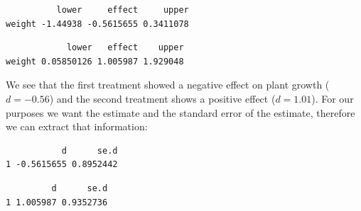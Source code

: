 \documentclass[
  letterpaper,
  DIV=11,
  numbers=noendperiod]{scrreprt}
\newenvironment{Shaded}{}{}
\newcommand{\AttributeTok}[1]{\textcolor[rgb]{0.00,0.34,0.68}{#1}}
\newcommand{\CommentTok}[1]{\textcolor[rgb]{0.54,0.53,0.53}{#1}}
\newcommand{\FunctionTok}[1]{\textcolor[rgb]{0.39,0.29,0.61}{#1}}
\newcommand{\NormalTok}[1]{\textcolor[rgb]{0.12,0.11,0.11}{#1}}
\newcommand{\OtherTok}[1]{\textcolor[rgb]{0.00,0.43,0.16}{#1}}
\newcommand{\SpecialCharTok}[1]{\textcolor[rgb]{0.24,0.68,0.91}{#1}}
\newcommand{\StringTok}[1]{\textcolor[rgb]{0.75,0.01,0.01}{#1}}
\begin{document}
\begin{tcolorbox}
\begin{verbatim}
          lower     effect     upper
weight -1.44938 -0.5615655 0.3411078
\end{verbatim}

\begin{Shaded}
\end{Shaded}

\begin{verbatim}
            lower   effect    upper
weight 0.05850126 1.005987 1.929048
\end{verbatim}

We see that the first treatment showed a negative effect on plant growth
(\(d=-0.56\)) and the second treatment shows a positive effect
(\(d=1.01\)). For our purposes we want the estimate and the standard
error of the estimate, therefore we can extract that information:

\begin{Shaded}
\end{Shaded}

\begin{verbatim}
           d      se.d
1 -0.5615655 0.8952442
\end{verbatim}

\begin{Shaded}
\end{Shaded}

\begin{verbatim}
         d      se.d
1 1.005987 0.9352736
\end{verbatim}

\end{tcolorbox}
\end{document}
